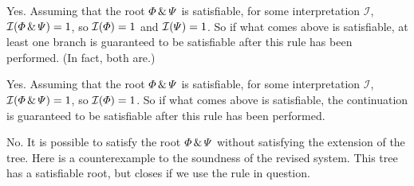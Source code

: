 \begin{earg}

\item Yes. Assuming that the root $\varPhi{} \,\&\, \varPsi{}$ is satisfiable, for some interpretation $\mathcal{I}$, $\mathcal{I}(\varPhi{} \,\&\, \varPsi{})=1$, so $\mathcal{I}(\varPhi{})=1$ and $\mathcal{I}(\varPsi{})=1$. So if what comes above is satisfiable, at least one branch is guaranteed to be satisfiable after this rule has been performed. (In fact, both are.)

%
%


\item Yes. Assuming that the root $\varPhi{} \,\&\, \varPsi{}$ is satisfiable, for some interpretation $\mathcal{I}$, $\mathcal{I}(\varPhi{} \,\&\, \varPsi{})=1$, so $\mathcal{I}(\varPhi{})=1$. So if what comes above is satisfiable, the continuation is guaranteed to be satisfiable after this rule has been performed.


%

\item No. It is possible to satisfy the root $\varPhi{} \,\&\, \varPsi{}$ without satisfying the extension of the tree. Here is a counterexample to the soundness of the revised system. This tree has a satisfiable root, but closes if we use the rule in question.


\end{earg}
